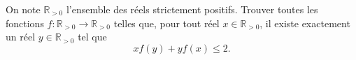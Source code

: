 On note $\mathbb{R}_{>0}$ l'ensemble des réels strictement positifs. Trouver toutes les fonctions
$f \colon \mathbb{R}_{>0} \to \mathbb{R}_{>0}$ telles que, pour tout réel $x \in \mathbb{R}_{>0}$, il existe
exactement un réel $y \in \mathbb{R}_{>0}$ tel que
\[
x f(y) + y f(x) \leqslant 2.
\]
